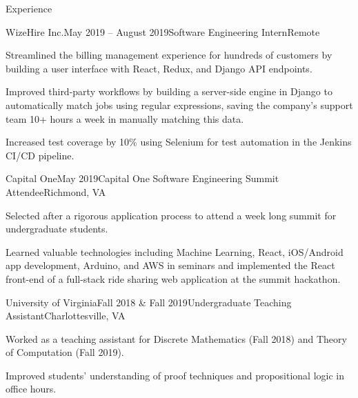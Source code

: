 \documentclass{resume}
\begin{document}
\begin{rSection}{Experience}

  \begin{rSubsection}{WizeHire Inc.}{May 2019 -- August 2019}{Software Engineering Intern}{Remote}
    \item Streamlined the billing management experience for hundreds of customers by building a user interface with React, Redux, and Django API endpoints.
    \item Improved third-party workflows by building a server-side engine in Django to automatically match jobs using regular expressions, saving the company's support team 10+ hours a week in manually matching this data.
    \item Increased test coverage by 10\% using Selenium for test automation in the Jenkins CI/CD pipeline.
  \end{rSubsection}

  \begin{rSubsection}{Capital One}{May 2019}{Capital One Software Engineering Summit Attendee}{Richmond, VA}
    \item Selected after a rigorous application process to attend a week long summit for undergraduate students.
    \item Learned valuable technologies including Machine Learning, React, iOS/Android app development, Arduino, and AWS in seminars and implemented the React front-end of a full-stack ride sharing web application at the summit hackathon.
  \end{rSubsection}

  \begin{rSubsection}{University of Virginia}{Fall 2018 \& Fall 2019}{Undergraduate Teaching Assistant}{Charlottesville, VA}
    \item Worked as a teaching assistant for Discrete Mathematics (Fall 2018) and Theory of Computation (Fall 2019).
    \item Improved students' understanding of proof techniques and propositional logic in office hours.
  \end{rSubsection}


\end{rSection}
\end{document}
